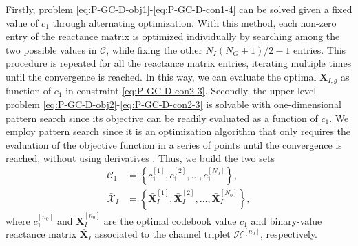 \documentclass[twocolumn,10pt]{IEEEtran}
\begin{document}
Firstly, problem \eqref{eq:P-GC-D-obj1}-\eqref{eq:P-GC-D-con1-4} can be solved given a fixed value of $c_1$ through alternating optimization.
With this method, each non-zero entry of the reactance matrix is optimized individually by searching among the two possible values in $\mathcal{C}$, while fixing the other $N_I\left(N_{G}+1\right)/2-1$ entries.
This procedure is repeated for all the reactance matrix entries, iterating multiple times until the convergence is reached.
In this way, we can evaluate the optimal $\mathbf{X}_{I,g}$ as function of $c_{1}$ in constraint \eqref{eq:P-GC-D-con2-3}.
Secondly, the upper-level problem \eqref{eq:P-GC-D-obj2}-\eqref{eq:P-GC-D-con2-3} is solvable with one-dimensional pattern search since its objective can be readily evaluated as a function of $c_{1}$.
We employ pattern search since it is an optimization algorithm that only requires the evaluation of the objective function in a series of points until the convergence is reached, without using derivatives \cite{aud02}.
Thus, we build the two sets
\begin{align}
\mathcal{C}_1&=\left\{c_1^{\left[1\right]},c_1^{\left[2\right]},\ldots,c_{1}^{\left[N_0\right]}\right\},\\
\bar{\mathcal{X}}_I&=\left\{\bar{\mathbf{X}}_I^{\left[1\right]},\bar{\mathbf{X}}_I^{\left[2\right]},\ldots,\bar{\mathbf{X}}_I^{\left[N_0\right]}\right\},
\end{align}
where $c_{1}^{\left[n_0\right]}$ and $\bar{\mathbf{X}}_I^{\left[n_0\right]}$ are the optimal codebook value $c_{1}$ and binary-value reactance matrix $\bar{\mathbf{X}}_I$ associated to the channel triplet $\mathcal{H}^{[n_0]}$, respectively.
\end{document}
